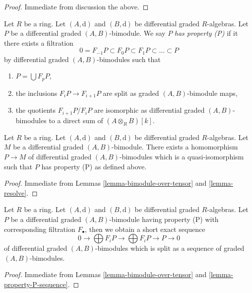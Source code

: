 \begin{proof}
Immediate from discussion the above.
\end{proof}

\noindent
Let $R$ be a ring. Let $(A, \text{d})$ and $(B, \text{d})$ be
differential graded $R$-algebras.
Let $P$ be a differential graded $(A, B)$-bimodule. We say $P$
{\it has property (P)} if it there exists a filtration
$$
0 = F_{-1}P \subset F_0P \subset F_1P \subset \ldots \subset P
$$
by differential graded $(A, B)$-bimodules such that
\begin{enumerate}
\item $P = \bigcup F_pP$,
\item the inclusions $F_iP \to F_{i + 1}P$ are split as graded
$(A, B)$-bimodule maps,
\item the quotients $F_{i + 1}P/F_iP$ are isomorphic as differential
graded $(A, B)$-bimodules to a direct sum of $(A \otimes_R B)[k]$.
\end{enumerate}

\begin{lemma}
\label{lemma-bimodule-resolve}
Let $R$ be a ring. Let $(A, \text{d})$ and $(B, \text{d})$ be
differential graded $R$-algebras. Let $M$ be a differential graded
$(A, B)$-bimodule. There exists a homomorphism $P \to M$
of differential graded $(A, B)$-bimodules which is a quasi-isomorphism
such that $P$ has property (P) as defined above.
\end{lemma}

\begin{proof}
Immediate from Lemmas \ref{lemma-bimodule-over-tensor} and
\ref{lemma-resolve}.
\end{proof}

\begin{lemma}
\label{lemma-bimodule-property-P-sequence}
Let $R$ be a ring. Let $(A, \text{d})$ and $(B, \text{d})$ be
differential graded $R$-algebras. Let $P$ be a
differential graded $(A, B)$-bimodule having property (P)
with corresponding filtration $F_\bullet$, then we obtain a
short exact sequence
$$
0 \to
\bigoplus\nolimits F_iP \to
\bigoplus\nolimits F_iP \to P \to 0
$$
of differential graded $(A, B)$-bimodules which is split as a sequence
of graded $(A, B)$-bimodules.
\end{lemma}

\begin{proof}
Immediate from Lemmas \ref{lemma-bimodule-over-tensor} and
\ref{lemma-property-P-sequence}.
\end{proof}















